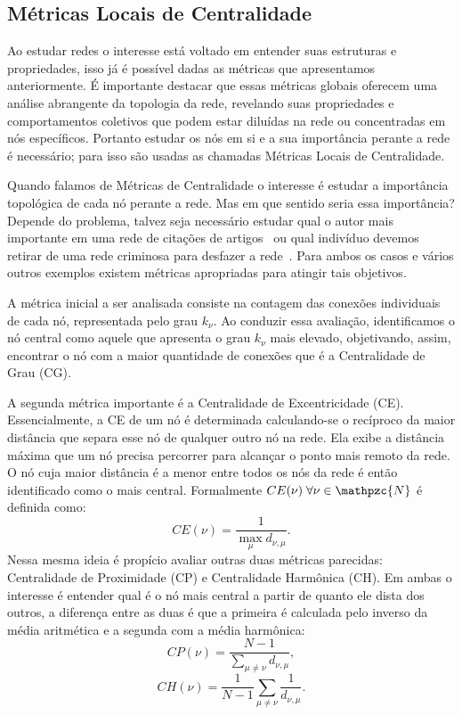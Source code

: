 \subsection{Métricas Locais de Centralidade}


Ao estudar redes o interesse está voltado em entender suas estruturas e propriedades, isso já é possível dadas as métricas que apresentamos anteriormente. É importante destacar que essas métricas globais oferecem uma análise abrangente da topologia da rede, revelando suas propriedades e comportamentos coletivos que podem estar diluídas na rede ou concentradas em nós específicos. Portanto estudar os nós em si e a sua importância perante a rede é necessário; para isso são usadas as chamadas Métricas Locais de Centralidade. 

Quando falamos de Métricas de Centralidade o interesse é estudar a importância topológica de cada nó perante a rede. 
Mas em que sentido seria essa importância? Depende do problema, talvez seja necessário estudar qual o autor mais importante em uma rede de citações de artigos~\cite{Leydesdorff2011} ou qual indivíduo devemos retirar de uma rede criminosa para desfazer a rede~\cite{deAndrade2021}. Para ambos os casos e vários outros exemplos existem métricas apropriadas para atingir tais objetivos.

A métrica inicial a ser analisada consiste na contagem das conexões individuais de cada nó, representada pelo grau $k_\nu$. Ao conduzir essa avaliação, identificamos o nó central como aquele que apresenta o grau $k_\nu$ mais elevado, objetivando, assim, encontrar o nó com a maior quantidade de conexões que é a Centralidade de Grau (CG).

A segunda métrica importante é a Centralidade de Excentricidade (CE). Essencialmente, a CE de um nó é determinada calculando-se o recíproco da maior distância que separa esse nó de qualquer outro nó na rede. Ela exibe a distância máxima que um nó precisa percorrer para alcançar o ponto mais remoto da rede. O nó cuja maior distância é a menor entre todos os nós da rede é então identificado como o mais central. Formalmente $CE(\nu)\; \forall \nu \in \mathpzc{N}$ é definida como:
\begin{equation}
  CE(\nu) = \frac{1}{\max\limits_{\mu} d_{\nu,\mu}}.
\end{equation}
Nessa mesma ideia é propício avaliar outras duas métricas parecidas: Centralidade de Proximidade (CP) e Centralidade Harmônica (CH). Em ambas o interesse é entender qual é o nó mais central a partir de quanto ele dista dos outros, a diferença entre as duas é que a primeira é calculada pelo inverso da média aritmética e a segunda com a média harmônica:
\begin{equation}
  CP(\nu) = \frac{N - 1}{\sum\limits_{\mu \neq \nu} d_{\nu,\mu}},
\end{equation}
\begin{equation}
  CH(\nu) = \frac{1}{N - 1}\sum_{\mu \neq \nu}\frac{1}{d_{\nu,\mu}}.
\end{equation}

